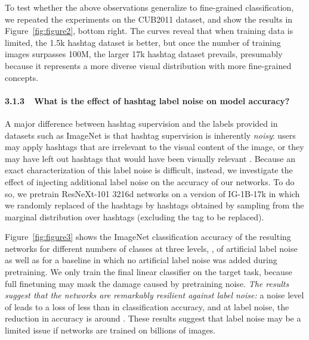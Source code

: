 \documentclass[runningheads]{llncs}
\begin{document}
To test whether the above observations generalize to fine-grained classification, we repeated the experiments on the CUB2011 dataset, and show the results in Figure~\ref{fig:figure2}, bottom right. The curves reveal that when training data is limited, the 1.5k hashtag dataset is better, but once the number of training images surpasses 100M, the larger 17k hashtag dataset prevails, presumably because it represents a more diverse visual distribution with more fine-grained concepts.

\paragraph{3.1.3~~What is the effect of hashtag label noise on model accuracy?} A major difference between hashtag supervision and the labels provided in datasets such as ImageNet is that hashtag supervision is inherently \emph{noisy}: users may apply hashtags that are irrelevant to the visual content of the image, or they may have left out hashtags that would have been visually relevant \cite{misra2016bias}. Because an exact characterization of this label noise is difficult, instead, we investigate the effect of injecting additional label noise on the accuracy of our networks. To do so, we pretrain ResNeXt-101 3216d networks on a version of IG-1B-17k in which we randomly replaced  of the hashtags by hashtags obtained by sampling from the marginal distribution over hashtags (excluding the tag to be replaced). 

Figure~\ref{fig:figure3} shows the ImageNet classification accuracy of the resulting networks for different numbers of classes at three levels, , of artificial label noise as well as for a baseline in which no artificial label noise was added during pretraining. We only train the final linear classifier on the target task, because full finetuning may mask the damage caused by pretraining noise. \emph{The results suggest that the networks are remarkably resilient against label noise:} a noise level of  leads to a loss of less than  in classification accuracy, and at  label noise, the reduction in accuracy is around . These results suggest that label noise may be a limited issue if networks are trained on billions of images.
\end{document}
